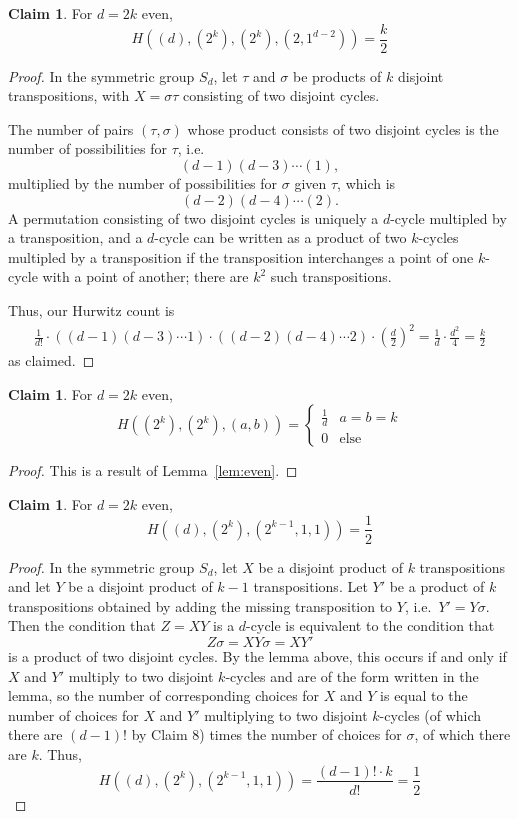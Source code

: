 \documentclass[thesis]{thesis-umich}           %
\theoremstyle{definition}
\newtheorem{claim}[thm]{Claim}
\begin{document}
\begin{claim}
  \label{claim:twoscomplete}
For $d=2k$ even,
\[
H((d),(2^k),(2^k),(2,1^{d-2}))=\frac k2
\]
\end{claim}
\begin{proof}
  In the symmetric group $S_d$, let $\tau$ and $\sigma$
  be products of $k$ disjoint transpositions, with $X=\sigma\tau$ consisting
  of two disjoint cycles.

  
  The number of pairs $(\tau,\sigma)$ whose product consists of two
  disjoint cycles is the number of possibilities for $\tau$, i.e.
  \[
  (d-1)(d-3)\cdots (1),
  \]
  multiplied by the number of possibilities for $\sigma$ given $\tau$, which is
  \[
  (d-2)(d-4)\cdots (2).\]
  A permutation consisting of two disjoint cycles
  is uniquely a $d$-cycle multipled by a transposition, and
  a $d$-cycle can be written as a product of two $k$-cycles multipled by a
  transposition if the transposition interchanges a point of one $k$-cycle
  with a point of another; there are $k^2$ such transpositions.

  Thus, our Hurwitz count is
  \begin{align*}
  \frac 1{d!}\cdot ((d-1)(d-3)\cdots 1)\cdot  ((d-2)(d-4)\cdots 2)\cdot\left(\frac d2\right)^2 = \frac{1}{d}\cdot\frac{d^2}{4}=\frac k2
  \end{align*}
  as claimed.
\end{proof}

\begin{claim}
  \label{claim:twoscycles}
  For $d=2k$ even,
  \[
  H((2^k),(2^k),(a,b))=\begin{cases}
  \frac 1d & a=b=k \\
  0 & \text{else}
  \end{cases}
  \]
\end{claim}
\begin{proof}
  This is a result of Lemma~\ref{lem:even}.
  \end{proof}

\begin{claim}
  \label{claim:twoseven}
For $d=2k$ even,
\[
H((d),(2^k),(2^{k-1},1,1))=\frac 12
\]
\end{claim}
\begin{proof}
  In the symmetric group $S_d$, let $X$ be a disjoint product of $k$ transpositions
  and let $Y$ be a disjoint product of $k-1$ transpositions. Let $Y'$ be a product
  of $k$ transpositions obtained by adding the missing transposition to $Y$, i.e.\ $Y'=Y\sigma$.
  Then the condition that $Z=XY$ is a $d$-cycle is equivalent to the condition that
  \[
  Z\sigma=XY\sigma=XY'
  \]
  is a product of two disjoint cycles. By the lemma above,
  this occurs if and only if $X$ and $Y'$ multiply to two disjoint $k$-cycles and are of
  the form written in the lemma, so the number of corresponding choices
  for $X$ and $Y$ is equal to the number of choices for $X$ and $Y'$ multiplying
  to two disjoint $k$-cycles (of which there are $(d-1)!$ by Claim 8) times the number
  of choices for $\sigma$, of which there are $k$. Thus,
  \[
  H((d),(2^k),(2^{k-1},1,1))=\frac{(d-1)!\cdot k}{d!}=\frac 12
  \]
  
  \end{proof}
\end{document}
